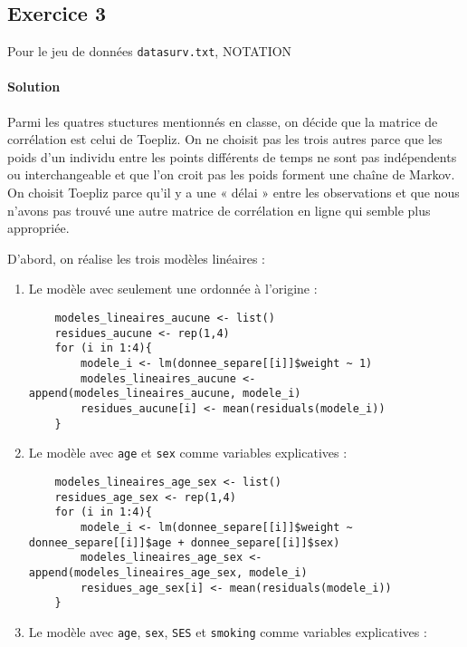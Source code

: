 \documentclass[../main.tex]{subfiles}
\begin{document}
\begin{CJK*}{UTF8}{gbsn}
\section*{Exercice 3}
Pour le jeu de données 
\texttt{datasurv.txt}, NOTATION

\paragraph{Solution}

Parmi les quatres stuctures mentionnés en classe, on décide que la matrice de corrélation 
est celui de Toepliz. On ne choisit pas les trois autres parce que les poids d'un individu 
entre les points différents de temps ne sont pas indépendents ou interchangeable et que l'on 
croit pas les poids forment une chaîne de Markov. On choisit Toepliz parce qu'il y a une « délai »
entre les observations et que nous n'avons pas trouvé une autre matrice de corrélation en ligne 
qui semble plus appropriée.

D'abord, on réalise les trois modèles linéaires :

\begin{enumerate}
    \item Le modèle avec seulement une ordonnée à l'origine :

\begin{lstlisting}
    modeles_lineaires_aucune <- list()
    residues_aucune <- rep(1,4)
    for (i in 1:4){
        modele_i <- lm(donnee_separe[[i]]$weight ~ 1)
        modeles_lineaires_aucune <- append(modeles_lineaires_aucune, modele_i)
        residues_aucune[i] <- mean(residuals(modele_i))
    }
\end{lstlisting}

    \item Le modèle avec \texttt{age} et \texttt{sex} comme variables explicatives :

\begin{lstlisting}
    modeles_lineaires_age_sex <- list()
    residues_age_sex <- rep(1,4)
    for (i in 1:4){
        modele_i <- lm(donnee_separe[[i]]$weight ~ donnee_separe[[i]]$age + donnee_separe[[i]]$sex)
        modeles_lineaires_age_sex <- append(modeles_lineaires_age_sex, modele_i)
        residues_age_sex[i] <- mean(residuals(modele_i))
    }
\end{lstlisting}

    \item Le modèle avec \texttt{age}, \texttt{sex}, \texttt{SES} et \texttt{smoking} comme variables explicatives : 


\end{enumerate}
\end{CJK*}
\end{document}
